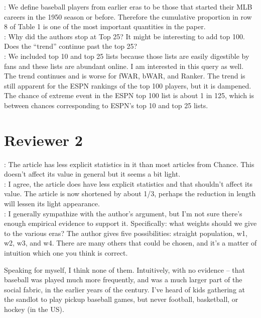 \documentclass[11pt]{article}
\begin{document}
: We define baseball players from earlier eras to be 
those that started their MLB careers in the 1950 season or before.  
Therefore the cumulative proportion in row 8 of Table 1 is one of the most 
important quantities in the paper. \\



:
Why did the authors stop at Top 25?  It might be interesting to add top 100.  
Does the ``trend'' continue past the top 25? \\

: We included top 10 and top 25 lists because those 
lists are easily digestible by fans and these lists are abundant online.  
I am interested in this query as well.  The trend continues and is worse for 
fWAR, bWAR, and Ranker.  The trend is still apparent for the ESPN rankings 
of the top 100 players, but it is dampened.  The chance of extreme event in 
the ESPN top 100 list is about 1 in 125, which is between chances 
corresponding to ESPN's top 10 and top 25 lists.
 



\section*{Reviewer 2}

:
The article has less explicit statistics in it than most articles from 
Chance.  This doesn't affect its value in general but it seems a bit light. \\

: 
I agree, the article does have less explicit statistics and that shouldn't 
affect its value.  %
The article is now shortened by about 1/3, perhaps the reduction in length 
will lessen its light appearance. \\



:
I generally sympathize with the author's argument, but I'm not sure there's 
enough empirical evidence to support it.  Specifically: what weights should we 
give to the various eras?  The author gives five possibilities: straight 
population, w1, w2, w3, and w4.  There are many others that could 
be chosen, and it's a matter of intuition which one you think is correct. 

Speaking for myself, I think none of them.  Intuitively, with no evidence -- 
that baseball was played much more frequently, and was a much larger part of 
the social fabric, in the earlier years of the century.  I've heard of kids 
gathering at the sandlot to play pickup baseball games, but never football, 
basketball, or hockey (in the US). 
\end{document}
